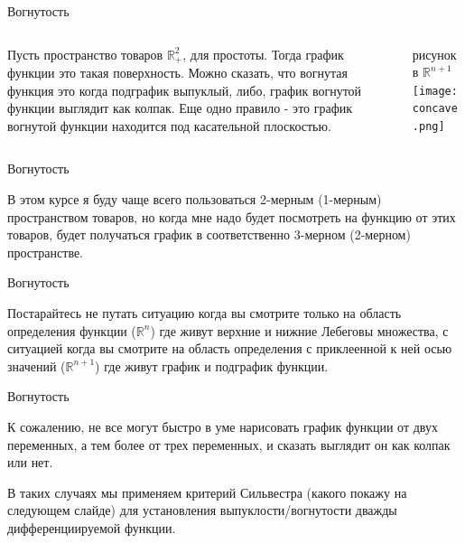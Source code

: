 \documentclass{beamer}
\begin{document}
\begin{frame}{Вогнутость}

\begin{columns}
\begin{column}{0.5\textwidth}
   Пусть пространство товаров $\mathbb{R}^{2}_+$, для простоты. Тогда график функции это такая поверхность. Можно сказать, что \alert{вогнутая функция это когда подграфик выпуклый}, либо, \alert{график вогнутой функции выглядит как колпак}. Еще одно правило - это \alert{график вогнутой функции находится под касательной плоскостью.}\end{column}
\begin{column}{0.5\textwidth}  %
    \begin{center}
    рисунок в $\mathbb{R}^{n+1}$
     \texttt{[image: concave.png]}
     \end{center}
\end{column}
\end{columns}

\end{frame}

\begin{frame}{Вогнутость}

В этом курсе я буду чаще всего пользоваться 2-мерным (1-мерным) пространством товаров, но когда мне надо будет посмотреть на функцию от этих товаров, будет получаться график в соответственно 3-мерном (2-мерном) пространстве.

\end{frame}


\begin{frame}{Вогнутость}

Постарайтесь не путать ситуацию когда вы смотрите только на область определения функции ($\mathbb{R}^{n}$) где живут верхние и нижние Лебеговы множества, с ситуацией когда вы смотрите на область определения с приклеенной к ней осью значений ($\mathbb{R}^{n+1}$) где живут график и подграфик функции.

\end{frame}

\begin{frame}{Вогнутость}

К сожалению, не все могут быстро в уме нарисовать график функции от двух переменных, а тем более от трех переменных, и сказать выглядит он как колпак или нет.

В таких случаях мы применяем \alert{критерий Сильвестра} (какого покажу на следующем слайде) для установления выпуклости/вогнутости дважды дифференциируемой функции.

\end{frame}
\end{document}
